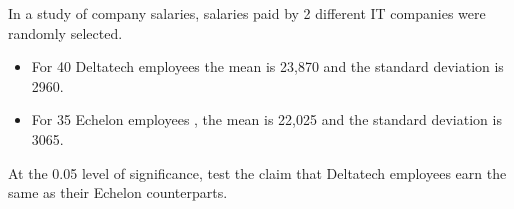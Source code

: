 \documentclass[a4paper,12pt]{article}
\begin{document}
\large  In a study of company salaries, salaries paid by 2 different IT companies were randomly selected.
 
 \begin{itemize}
 \item For 40 Deltatech employees the mean is 23,870 and the standard deviation is 2960.
 \item For 35 Echelon employees , the mean is 22,025 and the standard deviation is 3065.
 \end{itemize}
 
 At the 0.05 level of significance, test the claim that Deltatech employees earn the same as their  Echelon counterparts.
 
\noindent 
\end{document}
